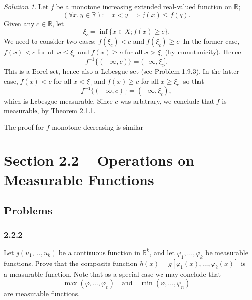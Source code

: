 \documentclass{report}
\newcommand{\bb}[1]{\mathbb{#1}}
\theoremstyle{remark}
\newtheorem*{solution}{Solution}
\begin{document}
\begin{solution}
  Let $f$ be a monotone increasing extended real-valued function on $\bb R$;
  \begin{equation*}
    (\forall x,y \in \bb R): \quad x < y \implies f(x) \le f(y).
  \end{equation*}
  Given any $c \in \bb R$, let
  \begin{equation*}
    \xi_c = \inf \{x \in X; f(x) \ge c\}.
  \end{equation*}
  We need to consider two cases: $f(\xi_c) < c$ and $f(\xi_c) \ge c$. In the former case, $f(x) < c$ for all $x \le \xi_c$ and $f(x) \ge c$ for all $x > \xi_c$ (by monotonicity). Hence
  \begin{equation*}
    f^{-1}\{(-\infty,c)\} = (-\infty, \xi_c].
  \end{equation*}
  This is a Borel set, hence also a Lebesgue set (see Problem 1.9.3). In the latter case, $f(x) < c$ for all $x < \xi_c$ and $f(x) \ge c$ for all $x \ge \xi_c$, so that
  \begin{equation*}
    f^{-1}\{(-\infty,c)\} = (-\infty, \xi_c),
  \end{equation*}
  which is Lebesgue-measurable. Since $c$ was arbitrary, we conclude that $f$ is measurable, by Theorem 2.1.1.

  The proof for $f$ monotone decreasing is similar.
\end{solution}

\section*{Section 2.2 -- Operations on Measurable Functions}

\subsection*{Problems}

\subsubsection*{2.2.2}
Let $g(u_1, \dots, u_k)$ be a continuous function in $\bb R^k$, and let $\varphi_1, \dots, \varphi_k$ be measurable functions. Prove that the composite function $h(x) = g[\varphi_1(x), \dots, \varphi_k(x)]$ is a measurable function. Note that as a special case we may conclude that
\begin{equation*}
  \max(\varphi, \dots, \varphi_n) \quad \text{and} \quad \min(\varphi, \dots, \varphi_n)
\end{equation*}
are measurable functions.
\end{document}
